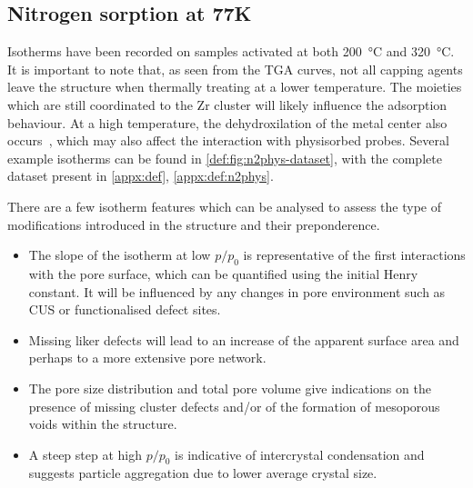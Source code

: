 
\subsection{Nitrogen sorption at 77K}

Isotherms have been recorded on samples activated at both
\SI{200}{\degreeCelsius} and \SI{320}{\degreeCelsius}.
It is important to note that, as seen from the \gls{TGA} curves,
not all capping agents leave the structure when thermally treating
at a lower temperature. The moieties which are still coordinated
to the Zr cluster will likely influence the adsorption
behaviour. At a high temperature, the dehydroxilation of the 
metal center also occurs~\cite{valenzanoDisclosingComplexStructure2011},
which may also affect the interaction with physisorbed probes. 
Several example isotherms can be found in
\autoref{def:fig:n2phys-dataset}, with the complete dataset
present in \autoref{appx:def}, \autoref{appx:def:n2phys}.

There are a few isotherm features which can be analysed to
assess the type of modifications introduced in the structure
and their preponderence.

\begin{itemize}
	\item The slope of the isotherm at low \(p/p_0\) is representative
	      of the first interactions with the pore surface, which can be
	      quantified using the initial Henry constant. It will be influenced
		  by any changes in pore environment such as CUS or functionalised
		  defect sites.
	\item Missing liker defects will lead to an increase of the
	      apparent surface area and perhaps to a more extensive
	      pore network.
	\item The pore size distribution and total pore volume give
	      indications on the presence of missing cluster defects and/or
	      of the formation of mesoporous voids within the structure.
	\item A steep step at high \(p/p_0\) is indicative of intercrystal
	      condensation and suggests particle aggregation due to lower average
	      crystal size.
\end{itemize}

